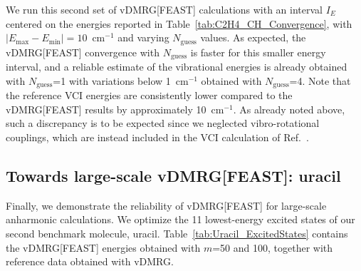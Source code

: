 \documentclass[journal=jctcce]{achemso}
\begin{document}
\noindent We run this second set of vDMRG[FEAST] calculations with an interval $I_E$ centered on the energies reported in Table~\ref{tab:C2H4_CH_Convergence}, with $\left| E_\text{max} - E_\text{min} \right| = 10$~cm$^{-1}$ and varying $N_\text{guess}$ values.
As expected, the vDMRG[FEAST] convergence with $N_\text{guess}$ is faster for this smaller energy interval, and a reliable estimate of the vibrational energies is already obtained with $N_\text{guess}$=1 with variations below 1~cm$^{-1}$ obtained with $N_\text{guess}$=4.
Note that the reference VCI energies\cite{Delahaye2014_EthylenePES} are consistently lower compared to the vDMRG[FEAST] results by approximately 10~cm$^{-1}$.
As already noted above, such a discrepancy is to be expected since we neglected vibro-rotational couplings, which are instead included in the VCI calculation of Ref.~.

\subsection{Towards large-scale vDMRG[FEAST]: uracil}

\noindent Finally, we demonstrate the reliability of vDMRG[FEAST] for large-scale anharmonic calculations.
We optimize the 11 lowest-energy excited states of our second benchmark molecule, uracil.
Table~\ref{tab:Uracil_ExcitedStates} contains the vDMRG[FEAST] energies obtained with $m$=50 and 100, together with reference data obtained with vDMRG.
\end{document}
